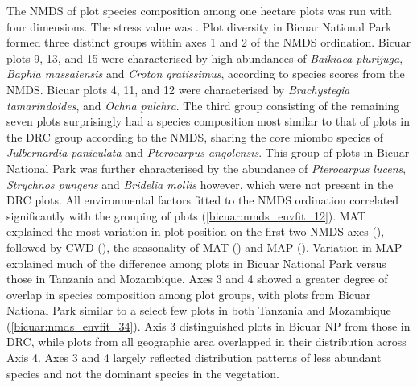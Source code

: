 \begin{refsection}
The NMDS of plot species composition among one hectare plots was run with four dimensions. The stress value was \nmdsstress{}. Plot diversity in Bicuar National Park formed three distinct groups within axes 1 and 2 of the NMDS ordination. Bicuar plots 9, 13, and 15 were characterised by high abundances of \textit{Baikiaea plurijuga}, \textit{Baphia massaiensis} and \textit{Croton gratissimus}, according to species scores from the NMDS. Bicuar plots 4, 11, and 12 were characterised  by \textit{Brachystegia tamarindoides}, and \textit{Ochna pulchra}. The third group consisting of the remaining seven plots surprisingly had a species composition most similar to that of plots in the DRC group according to the NMDS, sharing the core miombo species of \textit{Julbernardia paniculata} and \textit{Pterocarpus angolensis}. This group of plots in Bicuar National Park was further characterised by the abundance of \textit{Pterocarpus lucens}, \textit{Strychnos pungens} and \textit{Bridelia mollis} however, which were not present in the DRC plots. All environmental factors fitted to the NMDS ordination correlated significantly with the grouping of plots (\autoref{bicuar:nmds_envfit_12}). MAT explained the most variation in plot position on the first two NMDS axes (\nmdsmat{}), followed by CWD (\nmdsmapsd{}), the seasonality of MAT (\nmdsmatsd{}) and MAP (\nmdsmap{}). Variation in MAP explained much of the difference among plots in Bicuar National Park versus those in Tanzania and Mozambique. Axes 3 and 4 showed a greater degree of overlap in species composition among plot groups, with plots from Bicuar National Park similar to a select few plots in both Tanzania and Mozambique (\autoref{bicuar:nmds_envfit_34}). Axis 3 distinguished plots in Bicuar NP from those in DRC, while plots from all geographic area overlapped in their distribution across Axis 4. Axes 3 and 4 largely reflected distribution patterns of less abundant species and not the dominant species in the vegetation.


\end{refsection}
